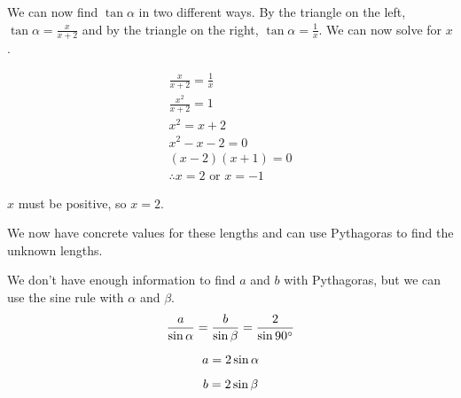\documentclass[a4paper]{article}
\begin{document}
We can now find $\tan \alpha$ in two different ways. By the triangle on the left, $\tan \alpha = \frac{x}{x + 2}$ and by the triangle on the right, $\tan \alpha = \frac{1}{x}$. We can now solve for $x$.

\begin{gather*}
\frac{x}{x + 2} = \frac{1}{x}\\[0.5em]
\frac{x^2}{x + 2} = 1\\[0.5em]
x^2 = x + 2\\[0.5em]
x^2 - x - 2 = 0\\[0.5em]
(x - 2)(x + 1) = 0\\[0.5em]
\therefore x = 2 \text{ or } x = - 1
\end{gather*}

$x$ must be positive, so $x = 2$.

We now have concrete values for these lengths and can use Pythagoras to find the unknown lengths.

\vspace*{0.5em}
\hspace{\fill}
\hspace{\fill}
\vspace*{0.5em}

We don't have enough information to find $a$ and $b$ with Pythagoras, but we can use the sine rule with $\alpha$ and $\beta$.
\begin{gather*}
\frac{a}{\sin\alpha} = \frac{b}{\sin\beta} = \frac{2}{\sin90\degree}\\[0.5em]
a = 2 \sin\alpha\\[0.5em]
b = 2 \sin\beta
\end{gather*}
\end{document}
